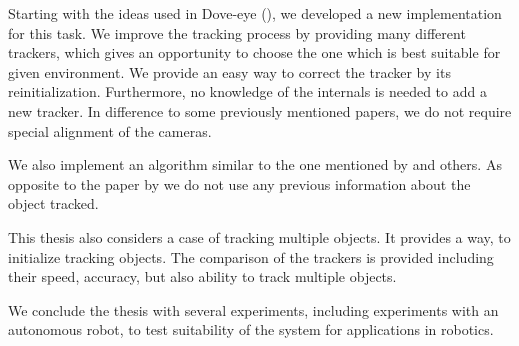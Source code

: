 Starting with the ideas used in Dove-eye (\citet*{dove-eye}), we developed a
new implementation for this task. We improve the tracking process by providing
many different trackers, which gives an opportunity to choose the one which is
best suitable for given environment. We provide an easy way to correct the
tracker by its reinitialization. Furthermore, no knowledge of the internals is
needed to add a new tracker.  In difference to some previously mentioned
papers, we do not require special alignment of the cameras. 

We also implement an algorithm similar to the one mentioned by
\citet*{ibisch2015arbitrary} and others. As opposite to the paper by
\citet*{kappeler20103d} we do not use any previous information about the object
tracked.

This thesis also considers a case of tracking multiple objects. It provides a
way, to initialize tracking objects. The comparison of the trackers is
provided including their speed, accuracy, but also ability to track
multiple objects.

We conclude the thesis with several experiments, including experiments with an autonomous
robot, to test suitability of the system for applications in robotics.

